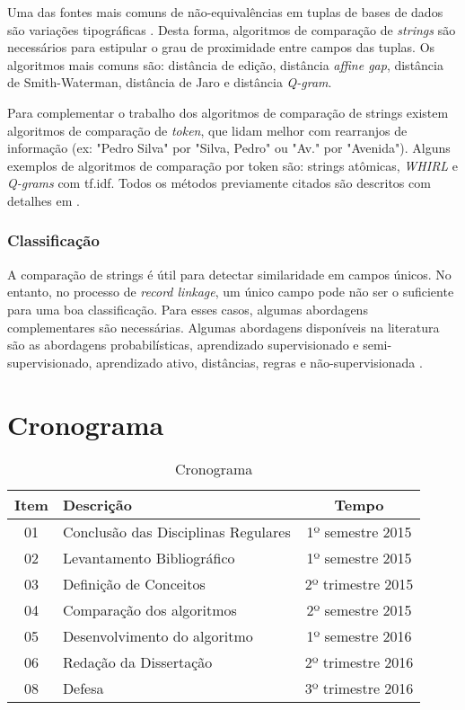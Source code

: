 \documentclass[
	12pt,				%
	openany,			%
	twoside,			%
	a4paper,			%
	brazil,				%
	]{unimontes-ppgmsc-abntex2}
\begin{document}
Uma das fontes mais comuns de não-equivalências em tuplas de bases de dados são variações tipográficas \cite{survey2}. Desta forma, algoritmos de comparação de \textit{strings} são necessários para estipular o grau de proximidade entre campos das tuplas. Os algoritmos mais comuns são: distância de edição, distância \textit{affine gap}, distância de Smith-Waterman, distância de Jaro e distância \textit{Q-gram}.

Para complementar o trabalho dos algoritmos de comparação de strings existem algoritmos de comparação de \textit{token}, que lidam melhor com rearranjos de informação (ex: "Pedro Silva" por "Silva, Pedro" ou "Av." por "Avenida"). Alguns exemplos de algoritmos de comparação por token são: strings atômicas, \textit{WHIRL} e \textit{Q-grams} com tf.idf. Todos os métodos previamente citados são descritos com detalhes em \cite{survey2}.

\subsection{Classificação}

A comparação de strings é útil para detectar similaridade em campos únicos. No entanto, no processo de \textit{record linkage}, um único campo pode não ser o suficiente para uma boa classificação. Para esses casos, algumas abordagens complementares são necessárias. Algumas abordagens disponíveis na literatura são as abordagens probabilísticas, aprendizado supervisionado e semi-supervisionado, aprendizado ativo, distâncias, regras e não-supervisionada \cite{survey2}.


\chapter{Cronograma}
\begin{table}[!htpb]
	\centering
 \begin{tabular}{|c|l|c|}
 	\hline \textbf{Item} & \textbf{Descrição} & \textbf{Tempo} \\ 
 	\hline 01 & Conclusão das Disciplinas Regulares & 1º semestre 2015 \\ 
 	\hline 02 & Levantamento Bibliográfico & 1º semestre 2015 \\ 
 	\hline 03 & Definição de Conceitos &  2º trimestre 2015\\ 
 	\hline 04 & Comparação dos algoritmos & 2º semestre 2015 \\ 
 	\hline 05 & Desenvolvimento do algoritmo & 1º semestre 2016 \\ 
 	\hline 06 & Redação da Dissertação &  2º trimestre 2016\\ 
 	\hline 08 & Defesa &  3º trimestre 2016 \\ 
 	\hline 
 \end{tabular} 
	\caption{Cronograma}
	\label{t_fixa}
\end{table}
 
\end{document}
